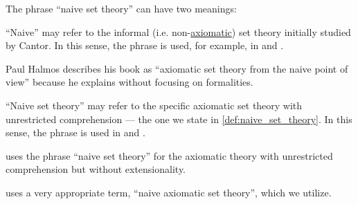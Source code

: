 \begin{remark}\label{rem:naive_set_theory}
  The phrase \enquote{naive set theory} can have two meanings:
  \begin{thmenum}
     \enquote{Naive} may refer to the informal (i.e. non-\hyperref[def:axiomatic_set_theory]{axiomatic}) set theory initially studied by Cantor. In this sense, the phrase is used, for example, in
    \cite[11]{Enderton1977SetTheory} and
    \cite[\S I.1]{Aluffi2009Algebra}.

    Paul Halmos describes his book \cite{Halmos1960NaiveSetTheory} as \enquote{axiomatic set theory from the naive point of view} because he explains \hyperref[def:zfc]{} without focusing on formalities.

     \enquote{Naive set theory} may refer to the specific axiomatic set theory with unrestricted comprehension --- the one we state in \cref{def:naive_set_theory}. In this sense, the phrase is used in
    \cite[\S I.1]{КолмогоровДрагалин2006ЛогикаДополнительныеГлавы} and
    \cite[\S 3.4]{Герасимов2014Вычислимость}.

    \Textcite[\S 5.3.1]{Mimram2020ProgramEqualsProof} uses the phrase \enquote{naive set theory} for the axiomatic theory with unrestricted comprehension but without extensionality.

    \Textcite[xii]{Andrews2002Logic} uses a very appropriate term, \enquote{naive axiomatic set theory}, which we utilize.
  \end{thmenum}
\end{remark}

